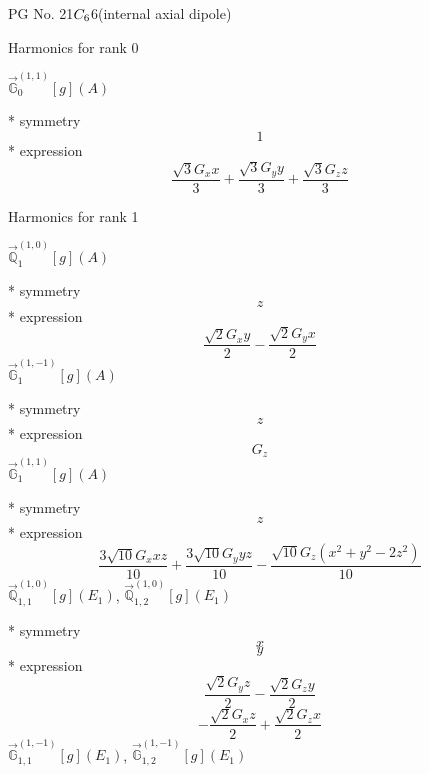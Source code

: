 \documentclass[fleqn,8pt]{jsarticle}
\begin{document}
\setcounter{MaxMatrixCols}{32}

\renewcommand{\tablename}{Table~}
\renewcommand{\figurename}{Figure~}
\begin{center}
\LARGE
PG No. 21\quad$C_{\rm 6}$\quad$6$\quad[ hexagonal ] (internal axial dipole)
\end{center}

\noindent * Harmonics for rank 0

\noindent\quad $\vec{\mathbb{G}}_{0}^{(1,1)}[g](A)$

\noindent\quad ** symmetry
\begin{dmath*}
1
\end{dmath*}
\noindent\quad ** expression
\begin{dmath*}
\frac{\sqrt{3} G_{x} x}{3} + \frac{\sqrt{3} G_{y} y}{3} + \frac{\sqrt{3} G_{z} z}{3}
\end{dmath*}

\noindent * Harmonics for rank 1

\noindent\quad $\vec{\mathbb{Q}}_{1}^{(1,0)}[g](A)$

\noindent\quad ** symmetry
\begin{dmath*}
z
\end{dmath*}
\noindent\quad ** expression
\begin{dmath*}
\frac{\sqrt{2} G_{x} y}{2} - \frac{\sqrt{2} G_{y} x}{2}
\end{dmath*}
\noindent\quad $\vec{\mathbb{G}}_{1}^{(1,-1)}[g](A)$

\noindent\quad ** symmetry
\begin{dmath*}
z
\end{dmath*}
\noindent\quad ** expression
\begin{dmath*}
G_{z}
\end{dmath*}
\noindent\quad $\vec{\mathbb{G}}_{1}^{(1,1)}[g](A)$

\noindent\quad ** symmetry
\begin{dmath*}
z
\end{dmath*}
\noindent\quad ** expression
\begin{dmath*}
\frac{3 \sqrt{10} G_{x} x z}{10} + \frac{3 \sqrt{10} G_{y} y z}{10} - \frac{\sqrt{10} G_{z} \left(x^{2} + y^{2} - 2 z^{2}\right)}{10}
\end{dmath*}
\noindent\quad $\vec{\mathbb{Q}}_{1,1}^{(1,0)}[g](E_{1})$, $\vec{\mathbb{Q}}_{1,2}^{(1,0)}[g](E_{1})$

\noindent\quad ** symmetry
\begin{dmath*}
x
\end{dmath*}
\begin{dmath*}
y
\end{dmath*}
\noindent\quad ** expression
\begin{dmath*}
\frac{\sqrt{2} G_{y} z}{2} - \frac{\sqrt{2} G_{z} y}{2}
\end{dmath*}
\begin{dmath*}
- \frac{\sqrt{2} G_{x} z}{2} + \frac{\sqrt{2} G_{z} x}{2}
\end{dmath*}
\noindent\quad $\vec{\mathbb{G}}_{1,1}^{(1,-1)}[g](E_{1})$, $\vec{\mathbb{G}}_{1,2}^{(1,-1)}[g](E_{1})$
\end{document}
